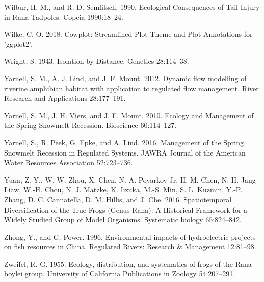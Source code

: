 \documentclass[proquest,12pt,final]{ucthesis-CA2012} %
\begin{document}
\begin{ucmainmatter}
\leavevmode\hypertarget{ref-wilbur_ecological_1990}{}%
Wilbur, H. M., and R. D. Semlitsch. 1990. Ecological Consequences of
Tail Injury in Rana Tadpoles. Copeia 1990:18--24.

\leavevmode\hypertarget{ref-wilke_cowplot_2018}{}%
Wilke, C. O. 2018. Cowplot: Streamlined Plot Theme and Plot Annotations
for 'ggplot2'.

\leavevmode\hypertarget{ref-wright_isolation_1943}{}%
Wright, S. 1943. Isolation by Distance. Genetics 28:114--38.

\leavevmode\hypertarget{ref-yarnell_dynamic_2012}{}%
Yarnell, S. M., A. J. Lind, and J. F. Mount. 2012. Dynamic flow
modelling of riverine amphibian habitat with application to regulated
flow management. River Research and Applications 28:177--191.

\leavevmode\hypertarget{ref-yarnell_ecology_2010}{}%
Yarnell, S. M., J. H. Viers, and J. F. Mount. 2010. Ecology and
Management of the Spring Snowmelt Recession. Bioscience 60:114--127.

\leavevmode\hypertarget{ref-yarnell_management_2016}{}%
Yarnell, S., R. Peek, G. Epke, and A. Lind. 2016. Management of the
Spring Snowmelt Recession in Regulated Systems. JAWRA Journal of the
American Water Resources Association 52:723--736.

\leavevmode\hypertarget{ref-yuan_spatiotemporal_2016}{}%
Yuan, Z.-Y., W.-W. Zhou, X. Chen, N. A. Poyarkov Jr, H.-M. Chen, N.-H.
Jang-Liaw, W.-H. Chou, N. J. Matzke, K. Iizuka, M.-S. Min, S. L. Kuzmin,
Y.-P. Zhang, D. C. Cannatella, D. M. Hillis, and J. Che. 2016.
Spatiotemporal Diversification of the True Frogs (Genus Rana): A
Historical Framework for a Widely Studied Group of Model Organisms.
Systematic biology 65:824--842.

\leavevmode\hypertarget{ref-zhong_environmental_1996}{}%
Zhong, Y., and G. Power. 1996. Environmental impacts of hydroelectric
projects on fish resources in China. Regulated Rivers: Research \&
Management 12:81--98.

\leavevmode\hypertarget{ref-zweifel_ecology_1955}{}%
Zweifel, R. G. 1955. Ecology, distribution, and systematics of frogs of
the Rana boylei group. University of California Publications in Zoology
54:207--291.

\end{ucmainmatter}
\end{document}
